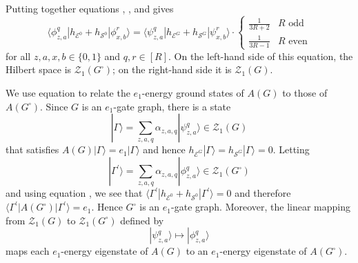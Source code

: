\documentclass[../thesis-main/thesis-main]{subfiles}
\begin{document}
Putting together equations , , and  gives
\begin{equation}
\langle\phi_{z,a}^{q}|h_{\mathcal{E}^{0}}+h_{\mathcal{S}^{0}}|\phi_{x,b}^{r}\rangle=\langle\psi_{z,a}^{q}|h_{\mathcal{E}^{G}}+h_{\mathcal{S}^{G}}|\psi_{x,b}^{r}\rangle\cdot\begin{cases}
\frac{1}{3R+2} & R\text{ odd}\\
\frac{1}{3R-1} & R\text{ even}
\end{cases}\label{eq:h_eG_hsG}
\end{equation}
for all $z,a,x,b\in\{0,1\}$ and $q,r\in[R]$. On the left-hand side of this equation, the Hilbert space is $\mathcal{Z}_{1}(G^{\square})$; on the right-hand side it is $\mathcal{Z}_{1}(G)$.

We use equation  to relate the $e_1$-energy ground states of $A(G)$ to those of $A(G^\square)$. Since $G$ is an $e_{1}$-gate graph, there is a state 
\[
|\Gamma\rangle=\sum_{z,a,q}\alpha_{z,a,q}|\psi_{z,a}^{q}\rangle\in\mathcal{Z}_{1}(G)
\]
that satisfies $A(G)|\Gamma\rangle=e_1|\Gamma\rangle$ and hence $h_{\mathcal{E}^{G}}|\Gamma\rangle=h_{\mathcal{S}^{G}}|\Gamma\rangle=0$. Letting
\[
|\Gamma^{\prime}\rangle=\sum_{z,a,q}\alpha_{z,a,q}|\phi_{z,a}^{q}\rangle\in\mathcal{Z}_{1}(G^{\square})
\]
and using equation , we see that $\langle\Gamma^{\prime}|h_{\mathcal{E}^{0}}+h_{\mathcal{S}^{0}}|\Gamma^{\prime}\rangle=0$ and therefore $\langle\Gamma^{\prime}|A(G^{\square})|\Gamma^{\prime}\rangle=e_{1}$. Hence $G^{\square}$ is an $e_{1}$-gate graph. Moreover, the linear mapping from $\mathcal{Z}_{1}(G)$ to $\mathcal{Z}_{1}(G^\square)$ defined by
\begin{equation}
|\psi_{z,a}^{q}\rangle \mapsto |\phi_{z,a}^{q}\rangle\label{eq:map_1particle}
\end{equation}
maps each $e_{1}$-energy eigenstate of $A(G)$ to an $e_{1}$-energy eigenstate of $A(G^{\square})$.
\end{document}
